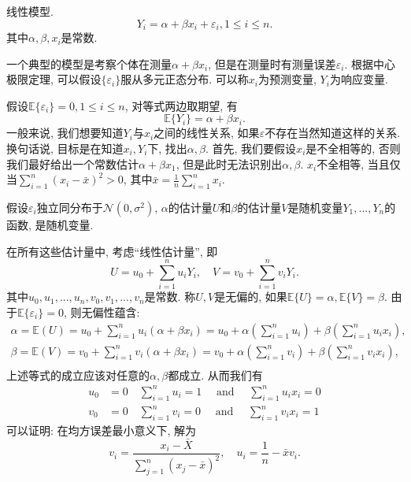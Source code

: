 \documentclass[UTF8, a4paper]{article}
\begin{document}
\begin{framed}
线性模型.
$$
Y_i = \alpha + \beta x_i + \varepsilon_i, 1 \leq i \leq n.
$$
其中\(\alpha, \beta, x_i\)是常数.

一个典型的模型是考察个体在测量\(\alpha + \beta x_i\), 但是在测量时有测量误差\(\varepsilon_i\).
根据中心极限定理, 可以假设\(\{\varepsilon_i\}\)服从多元正态分布. 可以称\(x_i\)为预测变量, \(Y_i\)为响应变量.

假设\(\mathbb{E}\{\varepsilon_i\} = 0, 1\leq i\leq n\), 对等式两边取期望, 有 
$$
\mathbb{E}\{Y_i\} = \alpha + \beta x_i.
$$
一般来说, 我们想要知道\(Y_i\)与\(x_i\)之间的线性关系, 如果\(\varepsilon\)不存在当然知道这样的关系. 换句话说, 目标是在知道\(x_i, Y_i\)下, 找出\(\alpha, \beta\).
首先, 我们要假设\(x_i\)是不全相等的, 否则我们最好给出一个常数估计\(\alpha + \beta x_1\), 但是此时无法识别出\(\alpha, \beta\). 
\(x_i\)不全相等, 当且仅当\(\sum_{i=1}^{n}(x_i - \bar{x})^2 > 0\), 其中\(\bar{x} = \frac{1}{n}\sum_{i=1}^{n}x_i\).

假设\(\varepsilon_i\)独立同分布于\(\mathcal{N}(0, \sigma^2)\), \(\alpha\)的估计量\(U\)和\(\beta\)的估计量\(V\)是随机变量\(Y_1, ..., Y_n\)的函数, 是随机变量.

在所有这些估计量中, 考虑``线性估计量'', 即 
$$
U = u_0 + \sum_{i=1}^{n}u_i Y_i, \quad V = v_0 + \sum_{i=1}^{n}v_i Y_i.
$$
其中\(u_0, u_1, ..., u_n, v_0, v_1, ..., v_n\)是常数. 称\(U, V\)是无偏的, 如果\(\mathbb{E}\{U\} = \alpha, \mathbb{E}\{V\} = \beta\).
由于\(\mathbb{E}\{\varepsilon_i\} = 0\), 则无偏性蕴含:
$$
\begin{gathered}
\alpha = \mathbb{E}(U) = u_0 + \sum_{i=1}^{n}u_i(\alpha + \beta x_i) = u_0 + \alpha\left(\sum_{i=1}^{n}u_i \right) + \beta \left(\sum_{i=1}^{n}u_i x_i\right), \\
\beta = \mathbb{E}(V) = v_0 + \sum_{i=1}^{n}v_i(\alpha + \beta x_i) = v_0 + \alpha \left(\sum_{i=1}^{n}v_i \right) + \beta \left(\sum_{i=1}^{n}v_i x_i\right), \\
\end{gathered}
$$
上述等式的成立应该对任意的\(\alpha, \beta\)都成立. 从而我们有
$$
\begin{aligned}
u_0 & =0 \quad \sum_{i=1}^n u_i=1 \quad \text { and } \quad \sum_{i=1}^n u_i x_i=0 \\
v_0 & =0 \quad \sum_{i=1}^n v_i=0 \quad \text { and } \quad \sum_{i=1}^n v_i x_i=1
\end{aligned}
$$
可以证明: 在均方误差最小意义下, 解为 
$$
v_i = \frac{x_i - \bar{X}}{\sum_{j=1}^{n}(x_j - \bar{x})^2}, \quad u_i = \frac{1}{n} - \bar{x}v_i.
$$
\end{framed}



\end{document}
